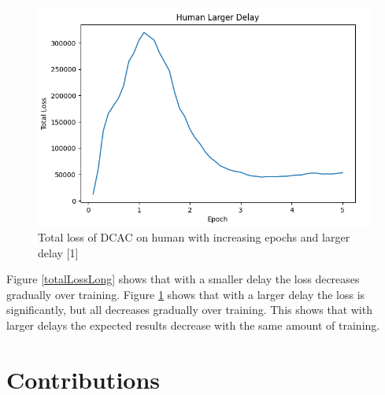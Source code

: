\documentclass{article} %
\begin{document}
\begin{figure}[H]
\begin{center}
\includegraphics[scale=0.3]{images/delay_human_loss.png}
\end{center}
\caption{Total loss of DCAC on human with increasing epochs and larger delay [1]}
\label{totalLossDelay}
\end{figure}

Figure \ref{totalLossLong} shows that with a smaller delay the loss decreases gradually over training.
Figure \ref{totalLossDelay} shows that with a larger delay the loss is significantly, but all decreases gradually over training.
This shows that with larger delays the expected results decrease with the same amount of training.

\section{Contributions}
\end{document}
